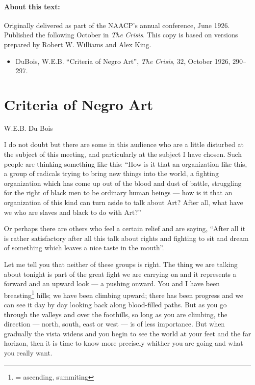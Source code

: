 \documentclass[12pt]{article}
\begin{document}
\setcounter{footnote}{0}

\setlength{\parskip}{4pt}
\setlength{\parindent}{14pt}




\paragraph{About this text:} Originally delivered %
as part of the NAACP's annual conference, June 1926. Published the following October in \emph{The Crisis}. This copy is based on versions prepared by Robert W. Williams and Alex King.


\begin{itemize}
\item DuBois, W.E.B. ``Criteria of Negro Art'', \emph{The Crisis}, 32, October 1926, 290--297.
\end{itemize}


\section*{Criteria of Negro Art}
W.E.B. Du Bois

\bigskip


\newcommand*{\duboispara}{}


{\duboispara}%
I do not doubt but there are some in this audience who are a little disturbed at the subject of this meeting, and particularly at the subject I have chosen. Such people are thinking something like this: ``How is it that an organization like this, a group of radicals trying to bring new things into the world, a fighting organization which has come up out of the blood and dust of battle, struggling for the right of black men to be ordinary human beings --- how is it that an organization of this kind can turn aside to talk about Art? After all, what have we who are slaves and black to do with Art?'' 

{\duboispara}%
Or perhaps there are others who feel a certain relief and are saying, ``After all it is rather satisfactory after all this talk about rights and fighting to sit and dream of something which leaves a nice taste in the mouth''.

{\duboispara}%
Let me tell you that neither of these groups is right. The thing we are talking about tonight is part of the great fight we are carrying on and it represents a forward and an upward look --- a pushing onward. You and I have been breasting\footnote{= ascending, summiting} hills; we have been climbing upward; there has been progress and we can see it day by day looking back along blood-filled paths. But as you go through the valleys and over the foothills, so long as you are climbing, the direction --- north, south, east or west --- is of less importance. But when gradually the vista widens and you begin to see the world at your feet and the far horizon, then it is time to know more precisely whither you are going and what you really want. 
\end{document}
